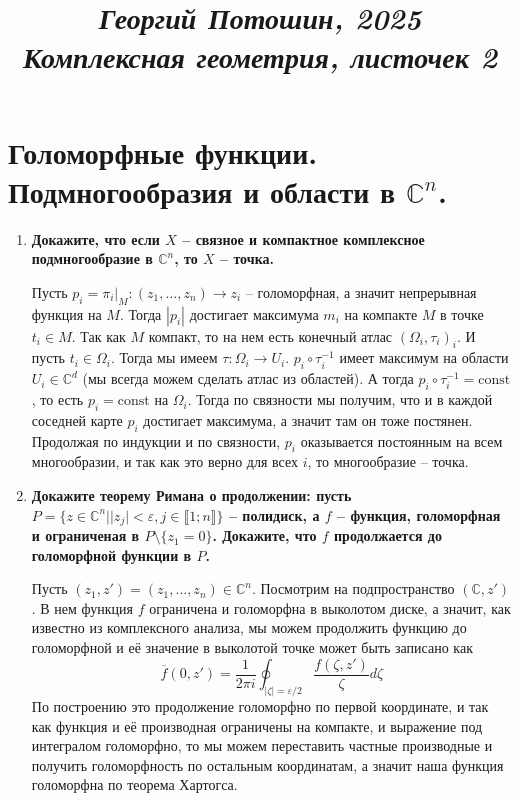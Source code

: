 \documentclass{article}
\title{
\textit{\small{Георгий Потошин, 2025}}\\
\vspace{0.3ex}
\textit{\huge{Комплексная геометрия, листочек 2}}\vspace{1ex}
}
\date{\vspace{-10ex}}
\begin{document}
\maketitle

\section{Голоморфные функции. Подмногообразия и области в $\mathbb C^n$.}
\begin{enumerate}
    \item \textbf{Докажите, что если $X$ – связное и компактное комплексное
        подмногообразие в $\mathbb C^n$, то $X$ – точка.}

        Пусть $p_i=\pi_i|_M:(z_1,\ldots,z_n)\rightarrow z_i$ – голоморфная, а значит
        непрерывная функция на $M$. Тогда $|p_i|$ достигает максимума $m_i$ на
        компакте $M$ в точке $t_i\in M$. Так как $M$ компакт, то на нем есть
        конечный атлас $(\Omega_i,\tau_i)_i$. И пусть $t_i\in\Omega_i$. Тогда мы
        имеем $\tau:\Omega_i\rightarrow U_i$. $p_i\circ\tau_i^{-1}$ имеет
        максимум на области $U_i\in\mathbb C^d$ (мы всегда можем сделать атлас
        из областей). А тогда $p_i\circ\tau_i^{-1}=\text{const}$, то есть $p_i=
        \text{const}$ на $\Omega_i$. Тогда по связности мы получим, что и в каждой
        соседней карте $p_i$ достигает максимума, а значит там он тоже постянен.
        Продолжая по индукции и по связности, $p_i$ оказывается постоянным на
        всем многообразии, и так как это верно для всех $i$, то многообразие – точка.

    \item \textbf{Докажите теорему Римана о продолжении: пусть $P=\{z\in
        \mathbb C^n | |z_j| < ε, j\in\llbracket1;n\rrbracket\}$ – полидиск, а
        $f$ – функция, голоморфная и ограниченая в $P\setminus\{z_1=0\}$. 
        Докажите, что $f$ продолжается до голоморфной функции в $P$.}

        Пусть $(z_1,z')=(z_1,\ldots,z_n)\in\mathbb C^n$. Посмотрим на
        подпространство $(\mathbb C, z')$. В нем функция $f$ ограничена и голоморфна
        в выколотом диске, а значит, как известно из комплексного анализа,
        мы можем продолжить функцию до голоморфной и её значение в выколотой
        точке может быть записано как
        \[\overline f(0,z')=\frac{1}{2\pi i}\oint_{|\zeta|=\varepsilon/2}\frac{
        f(\zeta,z')}{\zeta}d\zeta\]
        По построению это продолжение голоморфно по первой координате, и так
        как функция и её производная ограничены на компакте, и выражение под
        интегралом голоморфно, то мы можем переставить частные производные и
        получить голоморфность по остальным координатам, а значит наша функция
        голоморфна по теорема Хартогса.


\end{enumerate}
\end{document}
